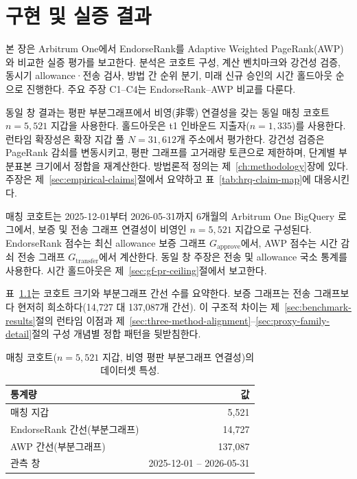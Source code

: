 ﻿%
\chapter{구현 및 실증 결과}
\label{ch:results}

본 장은 Arbitrum One에서 EndorseRank를 Adaptive Weighted PageRank(AWP)와 비교한 실증 평가를 보고한다. 분석은 코호트 구성, 계산 벤치마크와 강건성 검증, 동시기 allowance·전송 검사, 방법 간 순위 분기, 미래 신규 승인의 시간 홀드아웃 순으로 진행한다. 주요 주장 C1--C4는 EndorseRank--AWP 비교를 다룬다.

동일 창 결과는 평판 부분그래프에서 비영(非零) 연결성을 갖는 동일 매칭 코호트 $n=5{,}521$ 지갑을 사용한다. 홀드아웃은 t1 인바운드 지출자($n=1{,}335$)를 사용한다. 런타임 확장성은 확장 지갑 풀 $N=31{,}612$개 주소에서 평가한다. 강건성 검증은 PageRank 감쇠를 변동시키고, 평판 그래프를 고거래량 토큰으로 제한하며, 단계별 부분표본 크기에서 정합을 재계산한다. 방법론적 정의는 제~\ref{ch:methodology}장에 있다. 주장은 제~\ref{sec:empirical-claims}절에서 요약하고 표~\ref{tab:hrq-claim-map}에 대응시킨다.


매칭 코호트는 2025-12-01부터 2026-05-31까지 6개월의 Arbitrum One BigQuery 로그에서, 보증 및 전송 그래프 연결성이 비영인 $n=5{,}521$ 지갑으로 구성된다. EndorseRank 점수는 최신 allowance 보증 그래프 $G_{\text{approve}}$에서, AWP 점수는 시간 감쇠 전송 그래프 $G_{\text{transfer}}$에서 계산한다. 동일 창 주장은 전송 및 allowance 국소 통계를 사용한다. 시간 홀드아웃은 제~\ref{sec:gf-pr-ceiling}절에서 보고한다.

표~\ref{tab:dataset-stats}는 코호트 크기와 부분그래프 간선 수를 요약한다. 보증 그래프는 전송 그래프보다 현저히 희소하다(14{,}727 대 137{,}087개 간선). 이 구조적 차이는 제~\ref{sec:benchmark-results}절의 런타임 이점과 제~\ref{sec:three-method-alignment}--\ref{sec:proxy-family-detail}절의 구성 개념별 정합 패턴을 뒷받침한다.

\begin{table}[htbp]
\centering
\caption{매칭 코호트($n=5{,}521$ 지갑, 비영 평판 부분그래프 연결성)의 데이터셋 특성.}
\label{tab:dataset-stats}
\begin{tabular}{lr}
\toprule
통계량 & 값 \\
\midrule
매칭 지갑 & 5{,}521 \\
EndorseRank 간선(부분그래프) & 14{,}727 \\
AWP 간선(부분그래프) & 137{,}087 \\
관측 창 & 2025-12-01 -- 2026-05-31 \\
\bottomrule
\end{tabular}
\end{table}

